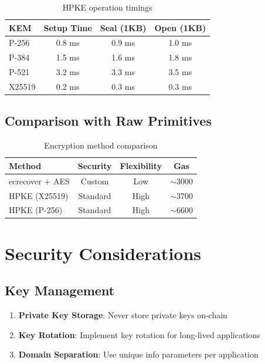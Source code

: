 \documentclass[11pt,a4paper]{article}
\theoremstyle{definition}
\begin{document}
\begin{table}[h]
\centering
\begin{tabular}{lccc}
\toprule
KEM & Setup Time & Seal (1KB) & Open (1KB) \\
\midrule
P-256 & 0.8 ms & 0.9 ms & 1.0 ms \\
P-384 & 1.5 ms & 1.6 ms & 1.8 ms \\
P-521 & 3.2 ms & 3.3 ms & 3.5 ms \\
X25519 & 0.2 ms & 0.3 ms & 0.3 ms \\
\bottomrule
\end{tabular}
\caption{HPKE operation timings}
\end{table}

\subsection{Comparison with Raw Primitives}

\begin{table}[h]
\centering
\begin{tabular}{lccc}
\toprule
Method & Security & Flexibility & Gas \\
\midrule
ecrecover + AES & Custom & Low & $\sim$3000 \\
HPKE (X25519) & Standard & High & $\sim$3700 \\
HPKE (P-256) & Standard & High & $\sim$6600 \\
\bottomrule
\end{tabular}
\caption{Encryption method comparison}
\end{table}

\section{Security Considerations}

\subsection{Key Management}

\begin{enumerate}
\item \textbf{Private Key Storage}: Never store private keys on-chain
\item \textbf{Key Rotation}: Implement key rotation for long-lived applications
\item \textbf{Domain Separation}: Use unique info parameters per application
\end{enumerate}
\end{document}
